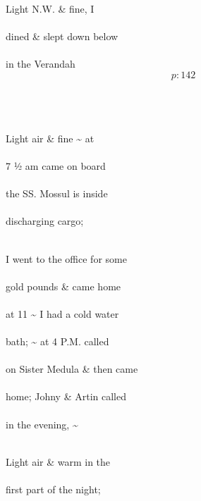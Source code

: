 \documentclass{report}
\begin{document}
	\par{
 	Light N.W. \& fine, I\ \\\ \\dined \& slept down below\ \\\ \\in the Verandah\ \\
  \[p: 142 \]
\ \\\ \\\ \\
	}

	\par{
 	Light air \& fine \~{} at\ \\\ \\7 ½ am came on board\ \\\ \\the SS. Mossul is inside\ \\\ \\discharging cargo;\ \\\ \\
	}

	\par{
 	I went to the office for some\ \\\ \\gold pounds \& came home\ \\\ \\at 11 \~{} I had a cold water\ \\\ \\bath; \~{} at 4 P.M. called\ \\\ \\on Sister Medula \& then came\ \\\ \\home; Johny \& Artin called\ \\\ \\in the evening, \~{}\ \\\ \\
	}

	\par{
 	Light air \& warm in the\ \\\ \\first part of the night;\ \\\ \\
	}

	\par{
 	\ \\
	}
\end{document}
